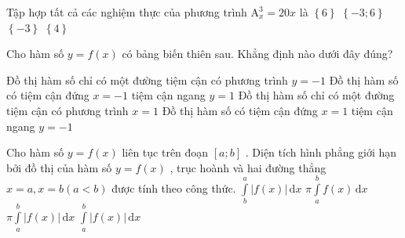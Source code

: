\begin{ex}%
	Tập hợp tất cả các nghiệm thực của phương trình $\mathrm{A}_{x}^{3}=20x$ là
	\choice
	{\True $\left\{6\right\}$}
	{$\left\{-3;6\right\}$}
	{$\left\{-3\right\}$}
	{$\left\{4\right\}$}
\end{ex}

\begin{ex}%
	Cho hàm số $y=f\left(x\right)$ có bảng biến thiên sau. Khẳng định nào dưới đây đúng?
	\begin{center}
	\end{center}
	\choice
	{Đồ thị hàm số chỉ có một đường tiệm cận có phương trình $y=-1$}
	{Đồ thị hàm số có tiệm cận đứng $x=-1$ tiệm cận ngang $y=1$}
	{Đồ thị hàm số chỉ có một đường tiệm cận có phương trình $x=1$}
	{\True Đồ thị hàm số có tiệm cận đứng $x=1$ tiệm cận ngang $y=-1$}
	\loigiai{
	
	}
\end{ex}

\begin{ex}%
	Cho hàm số $y=f(x)$ liên tục trên đoạn $\left[a;b\right]$ . Diện tích hình phẳng giới hạn bởi đồ thị của hàm số $y=f(x)$ , trục hoành và hai đường thẳng $x=a,x=b(a<b)$ được tính theo công thức.
	\choice
	{$\displaystyle\int\limits_{b}^{a}{\left|f(x)\right|}\mathrm{\,d}x$}
	{$\pi \displaystyle\int\limits_{a}^{b}{f(x)}\mathrm{\,d}x$}
	{$\pi \displaystyle\int\limits_{a}^{b}{\left|f(x)\right|}\mathrm{\,d}x$}
	{\True $\displaystyle\int\limits_{a}^{b}{\left|f(x)\right|}\mathrm{\,d}x$}
	\loigiai{
		
	}
\end{ex}

